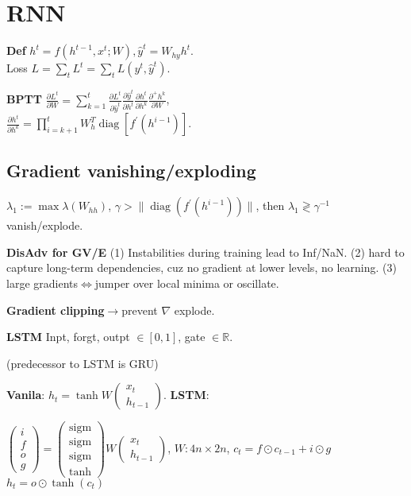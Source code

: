 \section{RNN}
\textbf{Def} \(h^{t}=f(h^{t-1}, x^{t} ; W), \hat{y}^{t}=W_{h y} h^{t}\).\\ Loss \(L = \sum_t L^{t} =\sum_t L(y^{t}, \hat{y}^{t})\).

\textbf{BPTT} \(\frac{\partial L^{t}}{\partial W}=\sum_{k=1}^{t} \frac{\partial L^{t}}{\partial \hat{y}^{t}} \frac{\partial \hat{y}^{t}}{\partial h^{t}} \frac{\partial h^{t}}{\partial h^{k}} \frac{\partial^{+} h^{k}}{\partial W}\),\\
\(\frac{\partial h^{t}}{\partial h^{k}}=\prod_{i=k+1}^{t} W_{h}^{T} \operatorname{diag}[f^{\prime}(h^{i-1})]\).


\subsection*{Gradient vanishing/exploding}
\(\lambda_1 := \max \lambda(W_{hh})\), \(\gamma > \|\operatorname{diag}(f^{\prime}(h^{i-1}))\|\), then \(\lambda_1 \gtrless  \gamma^{-1}\) vanish/explode.

\textbf{DisAdv for GV/E} (1) Instabilities during training lead to Inf/NaN. (2) hard to capture long-term dependencies, cuz no gradient at lower levels, no learning. (3) large gradients\(\Leftrightarrow\)jumper over local minima or oscillate.

\textbf{Gradient clipping}\(\to\)prevent \(\nabla\) explode.

\textbf{LSTM} Inpt, forgt, outpt \(\in [0, 1]\), gate \(\in\mathbb{R}\).

(predecessor to LSTM is GRU)

\textbf{Vanila}: \(h_{t}=\tanh W\left(\begin{array}{l}
    x_t \\
    h_{t-1}
    \end{array}\right)\).
\textbf{LSTM}:

\(\left(\begin{array}{l}
    i \\
    f \\
    o \\
    g
    \end{array}\right)=\left(\begin{array}{c}
    \operatorname{sigm} \\
    \operatorname{sigm} \\
    \operatorname{sigm} \\
    \tanh
    \end{array}\right) W\left(\begin{array}{l}
    x_t \\
    h_{t-1}
    \end{array}\right)\),
\(W : 4 n \!\!\times\!\! 2 n\), \(c_{t}=f \odot c_{t-1}+i \odot g\)  \(h_{t}=o \odot \tanh (c_{t})\)

